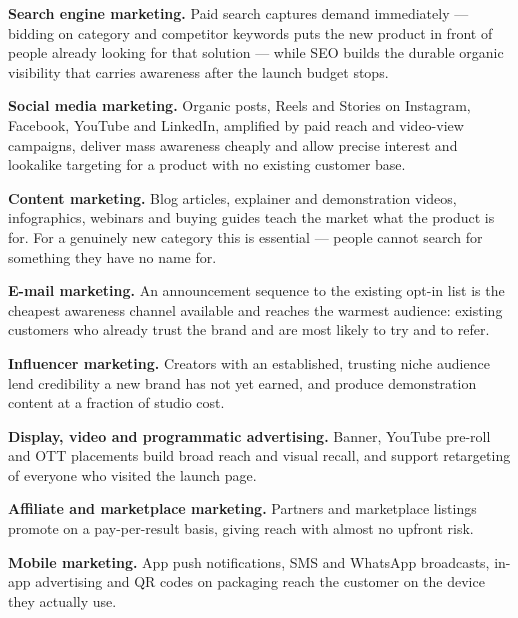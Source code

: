 \begin{qlist}
\begin{apts}
\item \textbf{Search engine marketing.} Paid search captures demand
      immediately --- bidding on category and competitor keywords puts the new
      product in front of people already looking for that solution --- while
      SEO builds the durable organic visibility that carries awareness after
      the launch budget stops.
\item \textbf{Social media marketing.} Organic posts, Reels and Stories on
      Instagram, Facebook, YouTube and LinkedIn, amplified by paid reach and
      video-view campaigns, deliver mass awareness cheaply and allow precise
      interest and lookalike targeting for a product with no existing customer
      base.
\item \textbf{Content marketing.} Blog articles, explainer and demonstration
      videos, infographics, webinars and buying guides teach the market what
      the product is for. For a genuinely new category this is essential ---
      people cannot search for something they have no name for.
\item \textbf{E-mail marketing.} An announcement sequence to the existing
      opt-in list is the cheapest awareness channel available and reaches the
      warmest audience: existing customers who already trust the brand and are
      most likely to try and to refer.
\item \textbf{Influencer marketing.} Creators with an established, trusting
      niche audience lend credibility a new brand has not yet earned, and
      produce demonstration content at a fraction of studio cost.
\item \textbf{Display, video and programmatic advertising.} Banner, YouTube
      pre-roll and OTT placements build broad reach and visual recall, and
      support retargeting of everyone who visited the launch page.
\item \textbf{Affiliate and marketplace marketing.} Partners and marketplace
      listings promote on a pay-per-result basis, giving reach with almost no
      upfront risk.
\item \textbf{Mobile marketing.} App push notifications, SMS and WhatsApp
      broadcasts, in-app advertising and QR codes on packaging reach the
      customer on the device they actually use.
\end{apts}


\end{qlist}
